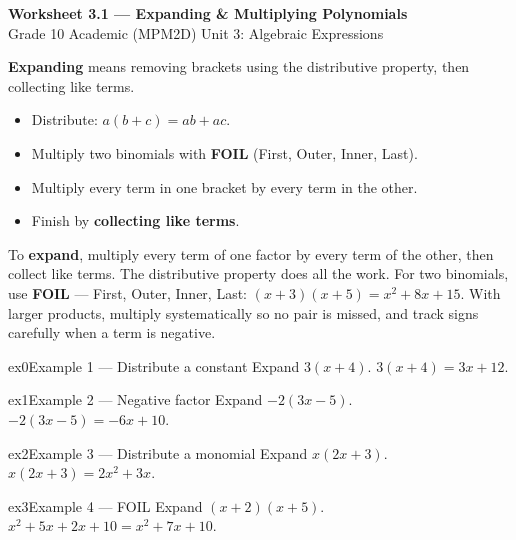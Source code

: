 \documentclass[11pt]{article}
\begin{document}
\begin{center}
{\LARGE\bfseries\color{titleblue}Worksheet 3.1 --- Expanding \& Multiplying Polynomials}\\[2pt]
{\small Grade 10 Academic (MPM2D) \textperiodcentered{} Unit 3: Algebraic Expressions}
\end{center}

\begin{ideabox}
\textbf{Expanding} means removing brackets using the distributive property, then collecting like terms.
\begin{itemize}[leftmargin=*,itemsep=2pt]
  \item Distribute: $a(b+c)=ab+ac$.
  \item Multiply two binomials with \textbf{FOIL} (First, Outer, Inner, Last).
  \item Multiply every term in one bracket by every term in the other.
  \item Finish by \textbf{collecting like terms}.
\end{itemize}
\end{ideabox}

\begin{learnbox}
To \textbf{expand}, multiply every term of one factor by every term of the other, then collect like terms. The distributive property does all the work.
For two binomials, use \textbf{FOIL} — First, Outer, Inner, Last: $(x+3)(x+5)=x^2+8x+15$.
With larger products, multiply systematically so no pair is missed, and track signs carefully when a term is negative.
\end{learnbox}


\begin{example}{ex0}{Example 1 --- Distribute a constant}
Expand $3(x+4)$.
\soln $3(x+4)=3x+12.$
\end{example}

\begin{example}{ex1}{Example 2 --- Negative factor}
Expand $-2(3x-5)$.
\soln $-2(3x-5)=-6x+10.$
\end{example}

\begin{example}{ex2}{Example 3 --- Distribute a monomial}
Expand $x(2x+3)$.
\soln $x(2x+3)=2x^2+3x.$
\end{example}

\begin{example}{ex3}{Example 4 --- FOIL}
Expand $(x+2)(x+5)$.
\soln $x^2+5x+2x+10=x^2+7x+10.$
\end{example}
\end{document}
